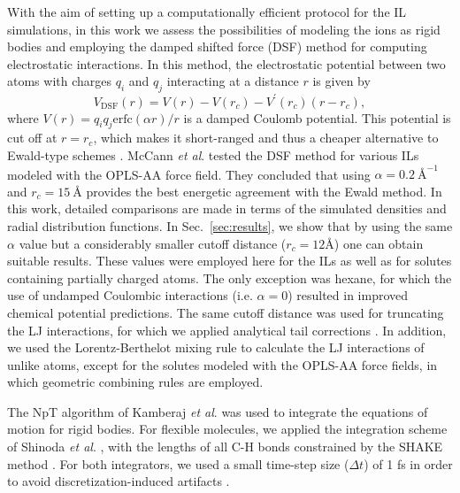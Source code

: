 \documentclass[3p,twocolumn]{elsarticle}
\begin{document}
With the aim of setting up a computationally efficient protocol for the IL simulations, in this work we assess the possibilities of modeling the ions as rigid bodies and employing the damped shifted force (DSF) method \cite{Fennell2006} for computing electrostatic interactions.
In this method, the electrostatic potential between two atoms with charges $q_i$ and $q_j$ interacting at a distance $r$ is given by
\begin{equation}
V_\text{DSF}(r) = V(r) - V(r_c) - V^\prime(r_c)(r-r_c),
\end{equation}
where $V(r) = q_i q_j {\text{erfc}(\alpha r)}/{r}$ is a damped Coulomb potential.
This potential is cut off at $r = r_c$, which makes it short-ranged and thus a cheaper alternative to Ewald-type schemes \cite{Ewald_1921,Darden_1993,Hockney_1988}.
McCann \textit{et al}. \cite{McCann_2013} tested the DSF method for various ILs modeled with the OPLS-AA force field.
They concluded that using $\alpha = 0.2~\text{\AA}^{-1}$ and $r_c = 15~\text{\AA}$ provides the best energetic agreement with the Ewald method.
In this work, detailed comparisons are made in terms of the simulated densities and radial distribution functions.
In Sec.~\ref{sec:results}, we show that by using the same $\alpha$ value but a considerably smaller cutoff distance ($r_c = 12 \text{\AA}$) one can obtain suitable results.
These values were employed here for the ILs as well as for solutes containing partially charged atoms.
The only exception was hexane, for which the use of undamped Coulombic interactions (i.e. $\alpha = 0$) resulted in improved chemical potential predictions. The same cutoff distance was used for truncating the LJ interactions, for which we applied analytical tail corrections \cite{allen}. In addition, we used the Lorentz-Berthelot mixing rule to calculate the LJ interactions of unlike atoms, except for the solutes modeled with the OPLS-AA force fields, in which geometric combining rules are employed.

The NpT algorithm of Kamberaj \textit{et al}. \cite{Kamberaj_2005} was used to integrate the equations of motion for rigid bodies.
For flexible molecules, we applied the integration scheme of Shinoda \textit{et al}. \cite{Shinoda2004}, with the lengths of all C-H bonds constrained by the SHAKE method \cite{Ryckaert1977}.
For both integrators, we used a small time-step size ($\Delta t$) of 1 fs in order to avoid discretization-induced artifacts \cite{Eastwood_2010, Silveira_2017}.
\end{document}
